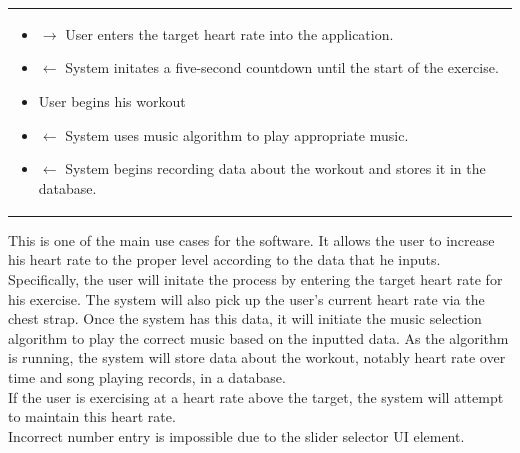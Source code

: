 \documentclass[letterpaper,english, 12pt]{scrreprt}
\begin{document}
\begin{center}
\begin{tabular}{|C{15cm}|}
                                \begin{itemize}
                                        \item $\rightarrow$ User enters the target heart rate into the application.
                                        \item $\leftarrow$ System initates a five-second countdown until the start of the exercise.
                                        \item User begins his workout
                                        \item $\leftarrow$ System uses music algorithm to play appropriate music.
                                        \item $\leftarrow$ System begins recording data about the workout and stores it in the database.
                                \end{itemize}
               	\hline
        \end{tabular}
\end{center}

This is one of the main use cases for the software. It allows the user to increase his heart rate to the proper level according to the data that he inputs. Specifically, the user will initate the process by entering the target heart rate for his exercise. The system will also pick up the user's current heart rate via the chest strap. Once the system has this data, it will initiate the music selection algorithm to play the correct music based on the inputted data. As the algorithm is running, the system will store data about the workout, notably heart rate over time and song playing records, in a database. \\
If the user is exercising at a heart rate above the target, the system will attempt to maintain this heart rate.\\
Incorrect number entry is impossible due to the slider selector UI element.\\
\end{document}
